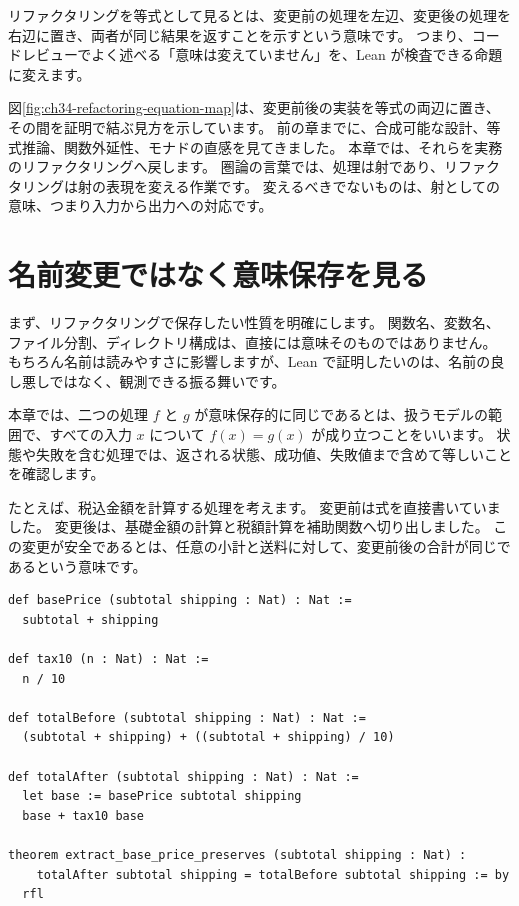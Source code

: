 リファクタリングを等式として見るとは、変更前の処理を左辺、変更後の処理を右辺に置き、両者が同じ結果を返すことを示すという意味です。
つまり、コードレビューでよく述べる「意味は変えていません」を、Lean が検査できる命題に変えます。


図\ref{fig:ch34-refactoring-equation-map}は、変更前後の実装を等式の両辺に置き、その間を証明で結ぶ見方を示しています。
前の章までに、合成可能な設計、等式推論、関数外延性、モナドの直感を見てきました。
本章では、それらを実務のリファクタリングへ戻します。
圏論の言葉では、処理は射であり、リファクタリングは射の表現を変える作業です。
変えるべきでないものは、射としての意味、つまり入力から出力への対応です。

\section{名前変更ではなく意味保存を見る}

まず、リファクタリングで保存したい性質を明確にします。
関数名、変数名、ファイル分割、ディレクトリ構成は、直接には意味そのものではありません。
もちろん名前は読みやすさに影響しますが、Lean で証明したいのは、名前の良し悪しではなく、観測できる振る舞いです。

本章では、二つの処理 \(f\) と \(g\) が意味保存的に同じであるとは、扱うモデルの範囲で、すべての入力 \(x\) について \(f(x) = g(x)\) が成り立つことをいいます。
状態や失敗を含む処理では、返される状態、成功値、失敗値まで含めて等しいことを確認します。

たとえば、税込金額を計算する処理を考えます。
変更前は式を直接書いていました。
変更後は、基礎金額の計算と税額計算を補助関数へ切り出しました。
この変更が安全であるとは、任意の小計と送料に対して、変更前後の合計が同じであるという意味です。

\begin{listing}[htbp]
\begin{verbatim}
def basePrice (subtotal shipping : Nat) : Nat :=
  subtotal + shipping

def tax10 (n : Nat) : Nat :=
  n / 10

def totalBefore (subtotal shipping : Nat) : Nat :=
  (subtotal + shipping) + ((subtotal + shipping) / 10)

def totalAfter (subtotal shipping : Nat) : Nat :=
  let base := basePrice subtotal shipping
  base + tax10 base

theorem extract_base_price_preserves (subtotal shipping : Nat) :
    totalAfter subtotal shipping = totalBefore subtotal shipping := by
  rfl
\end{verbatim}
\caption{\texttt{extract\_base\_price\_preserves}}
\label{lst:ch34-extract-base-price}
\end{listing}

